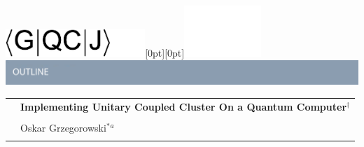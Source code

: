 \documentclass[twoside,twocolumn,9pt]{article}
\begin{document}
  \begin{@twocolumnfalse}
{\includegraphics[height=30pt]{head_foot/journal_name}\hfill\raisebox{0pt}[0pt][0pt]{\includegraphics[height=55pt]{head_foot/RSC_LOGO_CMYK}}\\[1ex]
\includegraphics[width=18.5cm]{head_foot/header_bar}}\par
\vspace{1em}
\sffamily
\begin{tabular}{m{4.5cm} p{13.5cm} }

& \noindent\LARGE{\textbf{Implementing Unitary Coupled Cluster On a Quantum Computer$^\dag$}} \\%
\vspace{0.3cm} & \vspace{0.3cm} \\

& \noindent\large{Oskar Grzegorowski$^{\ast}$\textit{$^{a}$}} \\%

& \\


\end{tabular}
\end{@twocolumnfalse}
\end{document}
